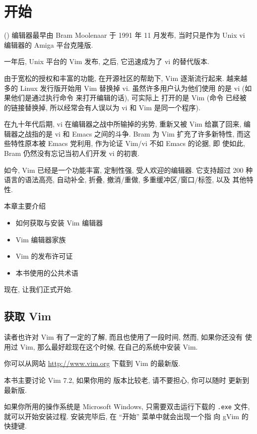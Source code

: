 \chapter{开始}
\label{chap:getting_started_with_vim}

 () 编辑器最早由 Bram Moolenaar 于
1991 年 11 月发布, 当时只是作为 Unix vi 编辑器的 Amiga 平台克隆版.

一年后, Unix 平台的 Vim 发布, 之后, 它迅速成为了 vi 的替代版本.

由于宽松的授权和丰富的功能, 在开源社区的帮助下, Vim 逐渐流行起来.
越来越多的 Linux 发行版开始用 Vim 替换掉 vi. 虽然许多用户认为他们使用
的是 vi (如果他们是通过执行命令 \vi 来打开编辑的话), 可实际上
打开的是 Vim (命令 \vi 已经被 \vim 的链接替换掉, 所以经常会有人误以为
vi 和 Vim 是同一个程序).

在九十年代后期, vi 在编辑器之战中所输掉的劣势, 重新又被 Vim 给赢了回来,
编辑器之战指的是 vi 和 Emacs 之间的斗争. Bram 为 Vim 扩充了许多新特性, 
而这些特性原本被  Emacs 党利用, 作为论证 Vim/vi 不如 Emacs 的论据, 即
使如此, Bram 仍然没有忘记当初人们开发 vi 的初衷.

如今, Vim 已经是一个功能丰富, 定制性强, 受人欢迎的编辑器. 它支持超过 200 
种语言的语法高亮, 自动补全, 折叠, 撤消/重做, 多重缓冲区/窗口/标签, 以及
其他特性.

本章主要介绍
\begin{itemize}
    \item 如何获取与安装 Vim 编辑器
    \item Vim 编辑器家族
    \item Vim 的发布许可证 
    \item 本书使用的公共术语
\end{itemize}
现在, 让我们正式开始.

\section{获取 Vim}
\label{sec:getting_vim}

读者也许对 Vim 有了一定的了解, 而且也使用了一段时间, 然而, 如果你还没有
使用过 Vim, 那么最好趁现在这个时候, 在自己的系统中安装 Vim.

你可以从网站 \url{http://www.vim.org} 下载到 Vim 的最新版.
\begin{warning}
本书主要讨论 Vim 7.2, 如果你用的 版本比较老, 请不要担心, 你可以随时
更新到最新版.
\end{warning}
如果你所用的操作系统是 Microsoft Windows, 只需要双击运行下载的 \texttt{.exe}
文件, 就可以开始安装过程. 安装完毕后, 在 ``开始'' 菜单中就会出现一个指
向 gVim 的快捷键.

